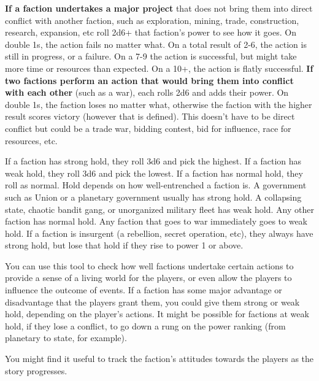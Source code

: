 \textbf{If a faction undertakes a major project} that does not bring them into direct conflict with another
faction, such as exploration, mining, trade, construction, research, expansion, etc roll 2d6+ that
faction’s power to see how it goes. On double 1s, the action fails no matter what. On a total result
of 2-6, the action is still in progress, or a failure. On a 7-9 the action is successful, but might take
more time or resources than expected. On a 10+, the action is flatly successful.
\textbf{If two factions perform an action that would bring them into conflict with each other} (such
as a war), each rolls 2d6 and adds their power. On double 1s, the faction loses no matter what,
otherwise the faction with the higher result scores victory (however that is defined). This doesn’t
have to be direct conflict but could be a trade war, bidding contest, bid for influence, race for
resources, etc.

If a faction has strong hold, they roll 3d6 and pick the highest. If a faction has weak hold, they roll
3d6 and pick the lowest. If a faction has normal hold, they roll as normal. Hold depends on how
well-entrenched a faction is. A government such as Union or a planetary government usually has
strong hold. A collapsing state, chaotic bandit gang, or unorganized military fleet has weak hold.
Any other faction has normal hold. Any faction that goes to war immediately goes to weak hold. If
a faction is insurgent (a rebellion, secret operation, etc), they always have strong hold, but lose
that hold if they rise to power 1 or above.

You can use this tool to check how well factions undertake certain actions to provide a sense of a
living world for the players, or even allow the players to influence the outcome of events. If a
faction has some major advantage or disadvantage that the players grant them, you could give
them strong or weak hold, depending on the player’s actions. It might be possible for factions at
weak hold, if they lose a conflict, to go down a rung on the power ranking (from planetary to state,
for example).

You might find it useful to track the faction’s attitudes towards the players as the story progresses.